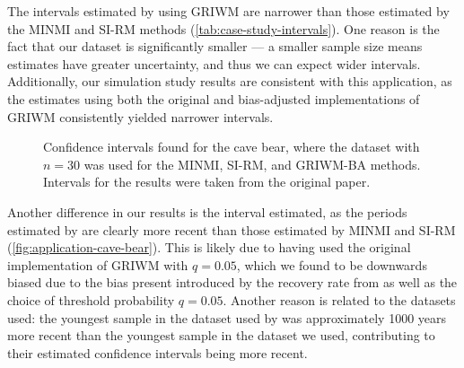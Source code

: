 The intervals estimated by \citet{Baca2016} using GRIWM are narrower than those estimated by the MINMI and SI-RM methods (\autoref{tab:case-study-intervals}). One reason is the fact that our dataset is significantly smaller --- a smaller sample size means estimates have greater uncertainty, and thus we can expect wider intervals. Additionally, our simulation study results are consistent with this application, as the estimates using both the original and bias-adjusted implementations of GRIWM consistently yielded narrower intervals.
\begin{figure}[ht]
    \centering
    
    \caption{Confidence intervals found for the cave bear, where the \citet{Cooper2015} dataset with $n=30$ was used for the MINMI, SI-RM, and GRIWM-BA methods. Intervals for the \citet{Baca2016} results were taken from the original paper.}
    \label{fig:application-cave-bear}
\end{figure}

Another difference in our results is the interval estimated, as the periods estimated by \citet{Baca2016} are clearly more recent than those estimated by MINMI and SI-RM (\autoref{fig:application-cave-bear}). This is likely due to \citet{Baca2016} having used the original implementation of GRIWM with $q = 0.05$, which we found to be downwards biased due to the bias present introduced by the recovery rate from \citet{Mcinerny2006} as well as the choice of threshold probability $q=0.05$. Another reason is related to the datasets used: the youngest sample in the dataset used by \citet{Baca2016} was approximately 1000 years more recent than the youngest sample in the dataset we used, contributing to their estimated confidence intervals being more recent.
